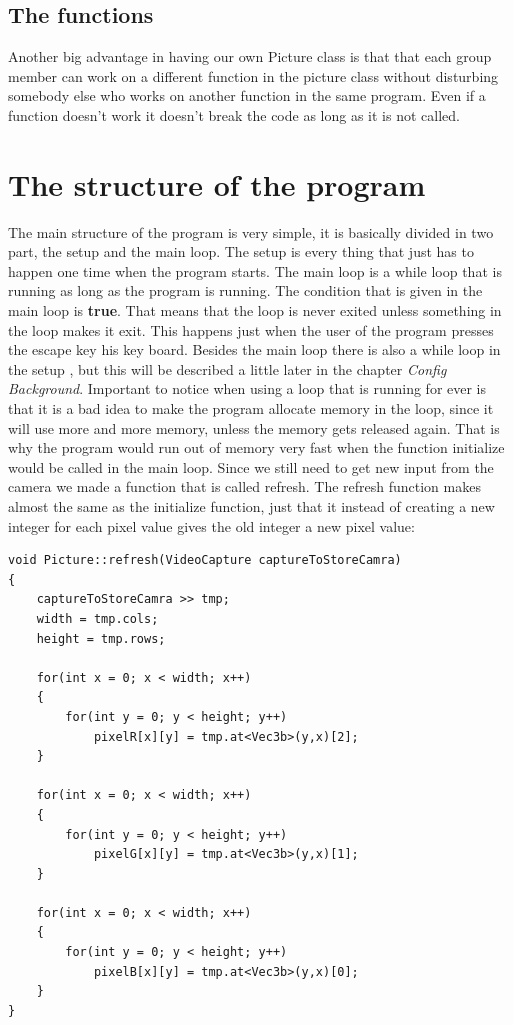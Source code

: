 \subsection{The functions}
Another big advantage in having our own Picture class is that that each group member can work on a different function in the picture class without disturbing somebody else who works on another function in the same program. Even if a function doesn't work it doesn't break the code as long as it is not called. 

\section{The structure of the program}

The main structure of the program is very simple, it is basically divided in two part, the setup and the main loop. The setup is every thing that just has to happen one time when the program starts. The main loop is a while loop that is running as long as the program is running. The condition that is given in the main loop is \textbf{true}. That means that the loop is never exited unless something in the loop makes it exit. This happens just when the user of the program presses the escape key his key board.
Besides the main loop there is also a while loop in the setup , but this will be described a little later in the chapter \textit{Config Background}. 
Important to notice when using a loop that is running for ever is that it is a bad idea to make the program allocate memory in the loop, since it will use more and more memory, unless the memory gets released again. That is why the program would run out of memory very fast when the function initialize would be called in the main loop. Since we still need to get new input from the camera we made a function that is called refresh. The refresh function makes almost the same as the initialize function, just that it instead of creating a new integer for each pixel value gives the old integer a new pixel value:

\begin{lstlisting}
void Picture::refresh(VideoCapture captureToStoreCamra)
{
	captureToStoreCamra >> tmp;
	width = tmp.cols;
	height = tmp.rows;

	for(int x = 0; x < width; x++)
	{
		for(int y = 0; y < height; y++)
			pixelR[x][y] = tmp.at<Vec3b>(y,x)[2];
	}

	for(int x = 0; x < width; x++)
	{
		for(int y = 0; y < height; y++)
			pixelG[x][y] = tmp.at<Vec3b>(y,x)[1];
	}

	for(int x = 0; x < width; x++)
	{
		for(int y = 0; y < height; y++)
			pixelB[x][y] = tmp.at<Vec3b>(y,x)[0];
	}
}
\end{lstlisting}

